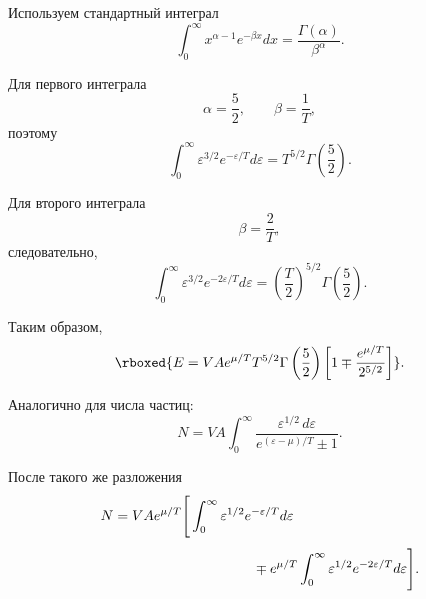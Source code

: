 \documentclass[../final.tex]{subfiles}
\begin{document}
Используем стандартный интеграл
%
\begin{equation*}
    \int_0^\infty
    x^{\alpha-1}
    e^{-\beta x}
    dx
    =
    \frac{
        \Gamma(\alpha)
    }{
        \beta^\alpha
    }.
\end{equation*}

Для первого интеграла
%
\begin{equation*}
    \alpha
    =
    \frac{5}{2},
    \qquad
    \beta
    =
    \frac{1}{T},
\end{equation*}
%
поэтому
%
\begin{equation*}
    \int_0^\infty
    \varepsilon^{3/2}
    e^{-\varepsilon/T}
    d\varepsilon
    =
    T^{5/2}
    \Gamma
    \left(
        \frac{5}{2}
    \right).
\end{equation*}

Для второго интеграла
%
\begin{equation*}
    \beta
    =
    \frac{2}{T},
\end{equation*}
%
следовательно,
%
\begin{equation*}
    \int_0^\infty
    \varepsilon^{3/2}
    e^{-2\varepsilon/T}
    d\varepsilon
    =
    \left(
        \frac{T}{2}
    \right)^{5/2}
    \Gamma
    \left(
        \frac{5}{2}
    \right).
\end{equation*}

Таким образом,
%
\[
    \rboxed{
        E
        =
        VAe^{\mu/T}
        T^{5/2}
        \Gamma
        \left(
            \frac{5}{2}
        \right)
        \left[
            1
            \mp
            \frac{
                e^{\mu/T}
            }{
                2^{5/2}
            }
        \right]
    }.
\]

Аналогично для числа частиц:
%
\begin{equation*}
    N
    =
    VA
    \int_0^\infty
    \frac{
        \varepsilon^{1/2}\,
        d\varepsilon
    }{
        e^{(\varepsilon-\mu)/T}\pm1
    }.
\end{equation*}

После такого же разложения
%
\begin{align*}
    N
    &=
    VAe^{\mu/T}
    \Bigg[
        \int_0^\infty
        \varepsilon^{1/2}
        e^{-\varepsilon/T}
        d\varepsilon
        \\[4pt]
        &\hspace{3.5cm}
        \mp
        e^{\mu/T}
        \int_0^\infty
        \varepsilon^{1/2}
        e^{-2\varepsilon/T}
        d\varepsilon
    \Bigg].
\end{align*}
\end{document}
